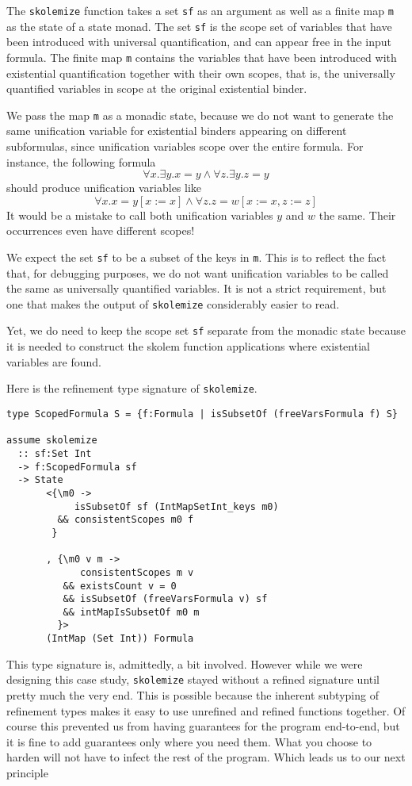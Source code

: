 \documentclass[sigconf]{acmart}
\newcommand{\tc}[1]{{\small\texttt{#1}}}
\begin{document}
The \tc{skolemize} function takes a set \tc{sf} as an argument as well as a
finite map \tc{m} as the state of a state monad. The set \tc{sf} is the scope set
of variables that have been
introduced with universal quantification, and can appear free in the
input formula. The finite map \tc{m} contains the variables
that have been introduced with existential quantification together with their own
scopes, that is, the universally quantified variables in scope at the original existential
binder.

We pass the map \tc{m} as a monadic state, because we do not
want to generate the same unification variable for existential binders appearing
on different subformulas, since unification variables scope over the entire formula. For instance, the following formula
$$\forall x. \exists y. x = y \land \forall z. \exists y. z = y$$
should produce unification variables like
$$\forall x. x = y[x:=x] \land \forall z. z = w[x:=x, z:=z]$$
It would be a mistake to call both unification variables $y$ and $w$ the same.
Their occurrences even have different scopes!

We expect the set \tc{sf} to be a subset of the keys in \tc{m}. This is to reflect the
fact that, for debugging purposes, we do not want unification variables to be called the same as
universally quantified variables. It is not a strict requirement, but one
that makes the output of \tc{skolemize} considerably easier to read.

Yet, we do need to keep the scope set \tc{sf} separate from the monadic
state because it is needed to construct the skolem function applications where
existential variables are found.

Here is the refinement type signature of \tc{skolemize}.
\begin{verbatim}
type ScopedFormula S = {f:Formula | isSubsetOf (freeVarsFormula f) S}

assume skolemize
  :: sf:Set Int
  -> f:ScopedFormula sf
  -> State
       <{\m0 ->
            isSubsetOf sf (IntMapSetInt_keys m0)
         && consistentScopes m0 f
        }

       , {\m0 v m ->
             consistentScopes m v
          && existsCount v = 0
          && isSubsetOf (freeVarsFormula v) sf
          && intMapIsSubsetOf m0 m
         }>
       (IntMap (Set Int)) Formula
\end{verbatim}

This type signature is, admittedly, a bit involved. However while we were
designing this case study, \tc{skolemize} stayed without a refined signature
until pretty much the very end. This is possible because the inherent subtyping
of refinement types makes it easy to use unrefined and refined functions together.
Of course this prevented us from having guarantees for the program end-to-end,
but it is fine to add guarantees only where you need them. What you choose
to harden will not have to infect the rest of the program.
Which leads us to our next principle
\end{document}
